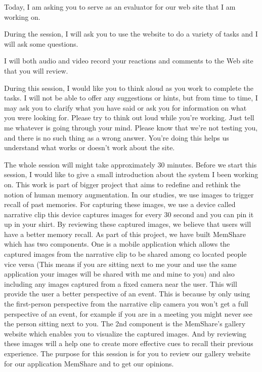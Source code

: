 \documentclass[mscthesis]{usiinfthesis}
\begin{document}
Today, I am asking you to serve as an evaluator for our web site that I am working on.

During the session, I will ask you to use the website to do a variety of tasks and I will ask some questions.

I will both audio and video record your reactions and comments to the Web site that you will review. 

During this session, I would like you to think aloud as you work to complete the tasks. I will not be able to offer any suggestions or hints, but from time to time, I may ask you to clarify what you have said or ask you for information on what you were looking for.
Please try to think out loud while you're working. Just tell me whatever is going through your mind. Please know that we're not testing you, and there is no such thing as a wrong answer. You're doing this helps us understand what works or doesn't work about the site.

The whole session will might take approximately 30 minutes.
Before we start this session, I would like to give a small introduction about the system I been working on. This work is part of bigger project that aims to redefine and rethink the notion of human memory augmentation. In our studies, we use images to trigger recall of past memories. For capturing these images, we use a device called narrative clip this device captures images for every 30 second and you can pin it up in your shirt. By reviewing these captured images, we believe that users will have a better memory recall. As part of this project, we have built MemShare which has two components. One is a mobile application which allows the captured images from the narrative clip to be shared among co located people vice versa (This means if you are sitting next to me your and use the same application your images will be shared with me and mine to you)  and also including any images captured from a fixed camera near the user. This will provide the user a better perspective of an event. This is because by only using the first-person perspective from the narrative clip camera you won't get a full perspective of an event, for example if you are in a meeting you might never see the person sitting next to you. The 2nd component is the MemShare's gallery website which enables you to visualize the captured images. And by reviewing these images will a help one to create more effective cues to recall their previous experience. The purpose for this session is for you to review our gallery website for our application MemShare and to get our opinions.
\end{document}
